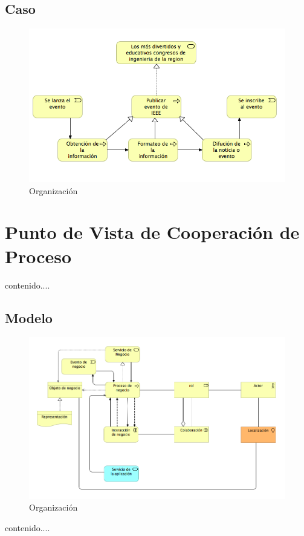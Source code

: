 \subsection{Caso}
\begin{figure}[th!]
	\centering
	\includegraphics[width=0.8\linewidth]{arquitectura_diseno/imgs/C_ProcesoNegocio}
	\caption{Organización}
\end{figure}
\newpage
\section{Punto de Vista de Cooperación de Proceso}
contenido....
\subsection{Modelo}
\begin{figure}[th!]
	\centering
	\includegraphics[width=0.8\linewidth]{arquitectura_diseno/imgs/M_CoperacionProceso}
	\caption{Organización}
\end{figure}
\newpage
contenido....
